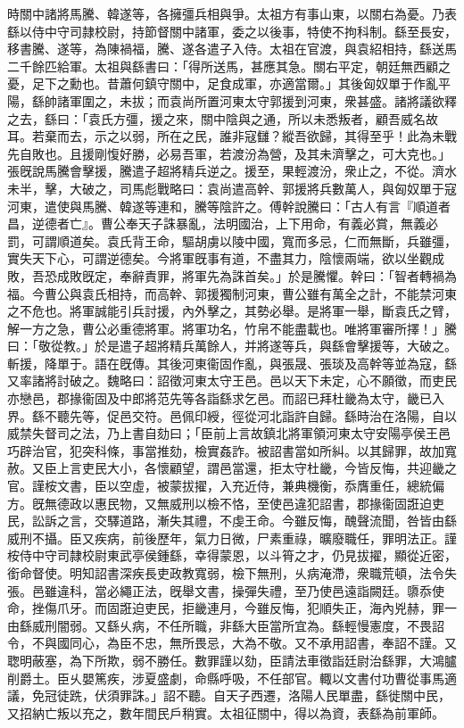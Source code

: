 \begin{pinyinscope}
時關中諸將馬騰、韓遂等，各擁彊兵相與爭。太祖方有事山東，以關右為憂。乃表繇以侍中守司隷校尉，持節督關中諸軍，委之以後事，特使不拘科制。繇至長安，移書騰、遂等，為陳禍福，騰、遂各遣子入侍。太祖在官渡，與袁紹相持，繇送馬二千餘匹給軍。太祖與繇書曰：「得所送馬，甚應其急。關右平定，朝廷無西顧之憂，足下之勳也。昔蕭何鎮守關中，足食成軍，亦適當爾。」其後匈奴單于作亂平陽，繇帥諸軍圍之，未拔；而袁尚所置河東太守郭援到河東，衆甚盛。諸將議欲釋之去，繇曰：「袁氏方彊，援之來，關中陰與之通，所以未悉叛者，顧吾威名故耳。若棄而去，示之以弱，所在之民，誰非寇讎？縱吾欲歸，其得至乎！此為未戰先自敗也。且援剛愎好勝，必易吾軍，若渡汾為營，及其未濟擊之，可大克也。」張旣說馬騰會擊援，騰遣子超將精兵逆之。援至，果輕渡汾，衆止之，不從。濟水未半，擊，大破之，司馬彪戰略曰：袁尚遣高幹、郭援將兵數萬人，與匈奴單于寇河東，遣使與馬騰、韓遂等連和，騰等陰許之。傅幹說騰曰：「古人有言『順道者昌，逆德者亡』。曹公奉天子誅暴亂，法明國治，上下用命，有義必賞，無義必罰，可謂順道矣。袁氏背王命，驅胡虜以陵中國，寬而多忌，仁而無斷，兵雖彊，實失天下心，可謂逆德矣。今將軍旣事有道，不盡其力，陰懷兩端，欲以坐觀成敗，吾恐成敗旣定，奉辭責罪，將軍先為誅首矣。」於是騰懼。幹曰：「智者轉禍為福。今曹公與袁氏相持，而高幹、郭援獨制河東，曹公雖有萬全之計，不能禁河東之不危也。將軍誠能引兵討援，內外擊之，其勢必舉。是將軍一舉，斷袁氏之臂，解一方之急，曹公必重德將軍。將軍功名，竹帛不能盡載也。唯將軍審所擇！」騰曰：「敬從教。」於是遣子超將精兵萬餘人，并將遂等兵，與繇會擊援等，大破之。斬援，降單于。語在旣傳。其後河東衞固作亂，與張晟、張琰及高幹等並為寇，繇又率諸將討破之。魏略曰：詔徵河東太守王邑。邑以天下未定，心不願徵，而吏民亦戀邑，郡掾衞固及中郎將范先等各詣繇求乞邑。而詔已拜杜畿為太守，畿已入界。繇不聽先等，促邑交符。邑佩印綬，徑從河北詣許自歸。繇時治在洛陽，自以威禁失督司之法，乃上書自劾曰；「臣前上言故鎮北將軍領河東太守安陽亭侯王邑巧辟治官，犯突科條，事當推劾，檢實姦詐。被詔書當如所糾。以其歸罪，故加寬赦。又臣上言吏民大小，各懷顧望，謂邑當還，拒太守杜畿，今皆反悔，共迎畿之官。謹桉文書，臣以空虛，被蒙拔擢，入充近侍，兼典機衡，忝膺重任，總統偏方。旣無德政以惠民物，又無威刑以檢不恪，至使邑違犯詔書，郡掾衞固誑迫吏民，訟訴之言，交驛道路，漸失其禮，不虔王命。今雖反悔，醜聲流聞，咎皆由繇威刑不攝。臣又疾病，前後歷年，氣力日微，尸素重祿，曠廢職任，罪明法正。謹桉侍中守司隷校尉東武亭侯鍾繇，幸得蒙恩，以斗筲之才，仍見拔擢，顯從近密，銜命督使。明知詔書深疾長吏政教寬弱，檢下無刑，乆病淹滯，衆職荒頓，法令失張。邑雖違科，當必繩正法，旣舉文書，操彈失禮，至乃使邑遠詣闕廷。隳忝使命，挫傷爪牙。而固誑迫吏民，拒畿連月，今雖反悔，犯順失正，海內兇赫，罪一由繇威刑闇弱。又繇乆病，不任所職，非繇大臣當所宜為。繇輕慢憲度，不畏詔令，不與國同心，為臣不忠，無所畏忌，大為不敬。又不承用詔書，奉詔不謹。又聦明蔽塞，為下所欺，弱不勝任。數罪謹以劾，臣請法車徵詣廷尉治繇罪，大鴻臚削爵土。臣乆嬰篤疾，涉夏盛劇，命縣呼吸，不任部官。輙以文書付功曹從事馬適議，免冠徒跣，伏須罪誅。」詔不聽。自天子西遷，洛陽人民單盡，繇徙關中民，又招納亡叛以充之，數年間民戶稍實。太祖征關中，得以為資，表繇為前軍師。


\end{pinyinscope}
